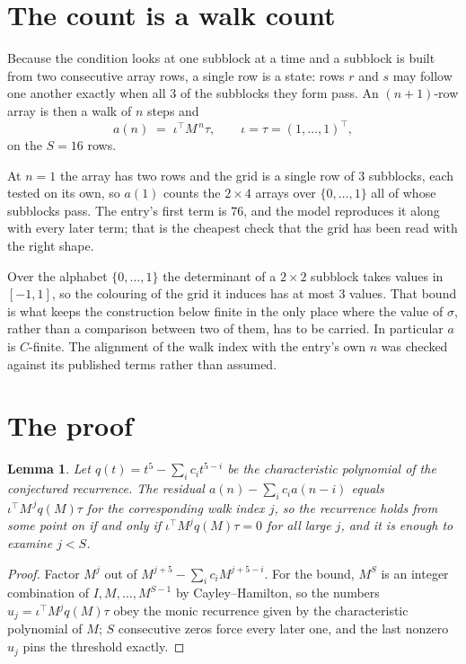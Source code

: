 \documentclass[11pt,a4paper]{article}
\theoremstyle{plain}
\newtheorem{lemma}[theorem]{Lemma}
\theoremstyle{definition}
\begin{document}
\section{The count is a walk count}

Because the condition looks at one subblock at a time and a subblock is
built from two consecutive array rows, a single row is a state: rows $r$ and $s$ may follow one
another exactly when all $3$ of the subblocks they form pass. An $(n+1)$-row array is then a
walk of $n$ steps and
\[
a(n)\;=\;\iota^{\!\top}M^{\,n}\tau,\qquad\iota=\tau=(1,\dots,1)^{\!\top},
\]
on the $S=16$ rows.

At $n=1$ the array has two rows and the grid is a single row of $3$
subblocks, each tested on its own, so $a(1)$ counts the
$2\times4$ arrays over $\{0,\dots,1\}$ all of whose subblocks pass. The entry's
first term is $76$, and the model reproduces it along with every later term; that is the
cheapest check that the grid has been read with the right shape.

Over the alphabet $\{0,\dots,1\}$ the determinant of a $2\times2$ subblock takes values in
$[-1,1]$, so the colouring of the grid it induces has at most $3$ values.
That bound is what keeps the construction below finite in the only place where the value of
$\sigma$, rather than a comparison between two of them, has to be carried.
In particular $a$ is $C$-finite. The alignment of the walk index with the entry's own $n$ was
checked against its published terms rather than assumed.

\section{The proof}

\begin{lemma}\label{lem:crit}
Let $q(t)=t^{5}-\sum_i c_it^{5-i}$ be the characteristic polynomial of the
conjectured recurrence. The residual $a(n)-\sum_ic_ia(n-i)$ equals
$\iota^{\!\top}M^{\,j}q(M)\tau$ for the corresponding walk index $j$, so the recurrence
holds from some point on if and only if $\iota^{\!\top}M^{j}q(M)\tau=0$ for all large $j$,
and it is enough to examine $j<S$.
\end{lemma}

\begin{proof}
Factor $M^{j}$ out of $M^{j+5}-\sum_ic_iM^{j+5-i}$. For the bound, $M^{S}$
is an integer combination of $I,M,\dots,M^{S-1}$ by Cayley--Hamilton, so the numbers
$u_j=\iota^{\!\top}M^{j}q(M)\tau$ obey the monic recurrence given by the characteristic
polynomial of $M$; $S$ consecutive zeros force every later one, and the last nonzero $u_j$
pins the threshold exactly.
\end{proof}
\end{document}
